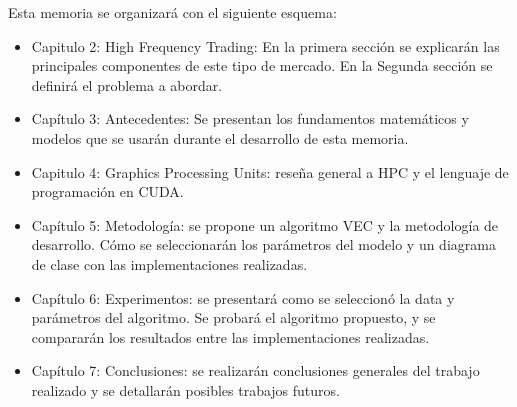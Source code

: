 \noindent Esta memoria se organizará con el siguiente esquema:
\begin{itemize}
 \item Capitulo 2: High Frequency Trading: En la primera sección se
explicarán las principales componentes de este tipo de mercado. En la
Segunda sección se definirá el problema a abordar.
 \item Capítulo 3: Antecedentes: Se presentan los fundamentos matemáticos y
modelos que se usarán durante el desarrollo de esta memoria.
 \item Capitulo 4: Graphics Processing Units: reseña general a HPC y el 
lenguaje de programación en CUDA.
 \item Capítulo 5: Metodología: se propone un algoritmo VEC y la metodología de
desarrollo. Cómo se seleccionarán los parámetros del modelo y un diagrama de
clase con las implementaciones realizadas.
 \item Capítulo 6: Experimentos: se presentará como se seleccionó la data y
parámetros del algoritmo. Se probará el algoritmo propuesto, y se compararán
los resultados entre las implementaciones realizadas.
 \item Capítulo 7: Conclusiones: se realizarán conclusiones generales del
trabajo realizado y se detallarán posibles trabajos futuros.
\end{itemize}
